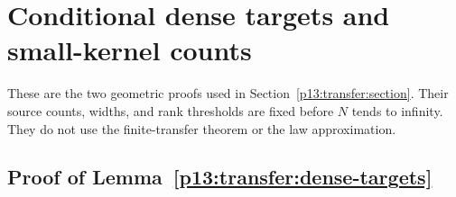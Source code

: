 \section{Conditional dense targets and small-kernel counts}
\label{p14:comp:transfer}

These are the two geometric proofs used in
Section~\ref{p13:transfer:section}. Their source counts, widths, and rank
thresholds are fixed before $N$ tends to infinity. They do not use the
finite-transfer theorem or the law approximation.

\subsection{Proof of Lemma~\ref{p13:transfer:dense-targets}}
\label{p14:comp:transfer-dense-targets}

